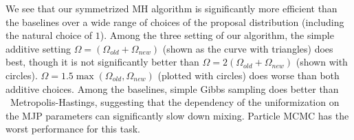 We see that our symmetrized MH algorithm is significantly more efficient 
than the baselines over a wide range of choices of the proposal distribution 
(including the natural choice of $1$).
Among the three setting of our algorithm, the simple additive setting
$\Omega = (\Omega_{old} + \Omega_{new})$ (shown as the curve with triangles) 
does best, though it is not significantly better than 
$\Omega = 2(\Omega_{old} + \Omega_{new})$ (shown with circles).
$\Omega = 1.5 \max(\Omega_{old}, \Omega_{new})$ (plotted with circles) does 
worse than both additive choices.
Among the baselines, simple Gibbs sampling 
does better than \naive\ Metropolis-Hastings, 
suggesting that the dependency of the 
uniformization on the MJP parameters can significantly slow down mixing.
Particle MCMC has the worst performance for this task.

